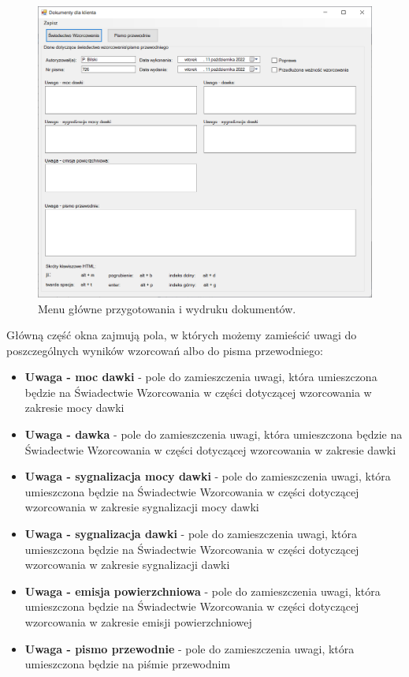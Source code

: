 {{{	\begin{figure}[htb]
		\centering
		\includegraphics[width=\columnwidth]{obrazki/Wzorcowanie/menu_swiadectwo.png}
		\caption{Menu główne przygotowania i wydruku dokumentów.}
		\label{menuSwiadectwo}
	\end{figure}

	Główną część okna zajmują pola, w których możemy zamieścić uwagi do poszczególnych wyników wzorcowań albo do pisma przewodniego:
	\begin{itemize}
		\item \textbf{Uwaga - moc dawki} - pole do zamieszczenia uwagi, która umieszczona będzie na Świadectwie Wzorcowania w części dotyczącej wzorcowania w zakresie mocy dawki
		\item \textbf{Uwaga - dawka} - pole do zamieszczenia uwagi, która umieszczona będzie na Świadectwie Wzorcowania w części dotyczącej wzorcowania w zakresie dawki
		\item \textbf{Uwaga - sygnalizacja mocy dawki} - pole do zamieszczenia uwagi, która umieszczona będzie na Świadectwie Wzorcowania w części dotyczącej wzorcowania w zakresie sygnalizacji mocy dawki
		\item \textbf{Uwaga - sygnalizacja dawki} - pole do zamieszczenia uwagi, która umieszczona będzie na Świadectwie Wzorcowania w części dotyczącej wzorcowania w zakresie sygnalizacji dawki
		\item \textbf{Uwaga - emisja powierzchniowa} - pole do zamieszczenia uwagi, która umieszczona będzie na Świadectwie Wzorcowania w części dotyczącej wzorcowania w zakresie emisji powierzchniowej
		\item \textbf{Uwaga - pismo przewodnie} - pole do zamieszczenia uwagi, która umieszczona będzie na piśmie przewodnim
	\end{itemize}

}}}
